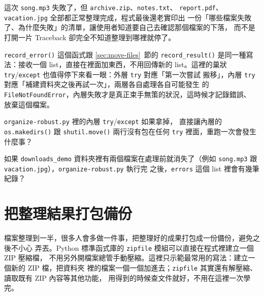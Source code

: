 這次 \texttt{song.mp3} 失敗了，但 \texttt{archive.zip}、\texttt{notes.txt}、
\texttt{report.pdf}、\texttt{vacation.jpg} 全部都正常整理完成，程式最後還老實印出
一份「哪些檔案失敗了、為什麼失敗」的清單，讓使用者知道要自己去確認那個檔案的下落，
而不是打開一片 Traceback 卻完全不知道整理到哪裡就停了。

\texttt{record\_error()} 這個函式跟 \ref{sec:move-files}~節的 \texttt{record\_result()}
是同一種寫法：接收一個 list，直接在裡面加東西，不用回傳新的 list。這裡的巢狀
\texttt{try}/\texttt{except} 也值得停下來看一眼：外層 \texttt{try} 對應「第一次嘗試
搬移」，內層 \texttt{try} 對應「補建資料夾之後再試一次」，兩層各自處理各自可能發生
的 \texttt{FileNotFoundError}，內層失敗才是真正束手無策的狀況，這時候才記錄錯誤、
放棄這個檔案。


\begin{drills}[label=drills:robust-errors]
\item \texttt{organize-robust.py} 裡的內層 \texttt{try}/\texttt{except} 如果拿掉，
直接讓內層的 \texttt{os.makedirs()} 跟 \texttt{shutil.move()} 兩行沒有包在任何
\texttt{try} 裡面，重跑一次會發生什麼事？
\item 如果 \texttt{downloads\_demo} 資料夾裡有兩個檔案在處理前就消失了（例如
\texttt{song.mp3} 跟 \texttt{vacation.jpg}），\texttt{organize-robust.py} 執行完
之後，\texttt{errors} 這個 list 裡會有幾筆紀錄？
\end{drills}

\section{把整理結果打包備份}
\label{sec:backup-zip}

檔案整理到一半，很多人會多做一件事，把整理好的成果打包成一份備份，避免之後不小心
弄丟。Python 標準函式庫的 \texttt{zipfile} 模組可以直接在程式裡建立一個 ZIP 壓縮檔，
不用另外開檔案總管手動壓縮。這裡只示範最常用的寫法：建立一個新的 ZIP 檔，把資料夾
裡的檔案一個一個加進去；\texttt{zipfile} 其實還有解壓縮、讀取既有 ZIP 內容等其他功能，
用得到的時候查文件就好，不用在這裡一次學完。

